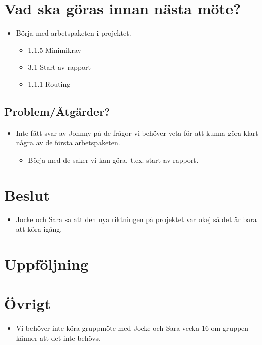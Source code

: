 \section*{Vad ska göras innan nästa möte?}
\begin{itemize}[noitemsep]
	\item Börja med arbetspaketen i projektet.
	\begin{itemize}
		\item 1.1.5 Minimikrav
		\item 3.1 Start av rapport
		\item 1.1.1 Routing
	\end{itemize}
\end{itemize}
\subsection*{Problem/Åtgärder?}
\begin{itemize}
	\item Inte fått svar av Johnny på de frågor vi behöver veta för att kunna göra klart några av de första arbetspaketen.
	\begin{itemize}
		\item Börja med de saker vi kan göra, t.ex. start av rapport.
	\end{itemize}
\end{itemize}

\section*{Beslut}
\begin{itemize}
	\item Jocke och Sara sa att den nya riktningen på projektet var okej så det är bara att köra igång.
\end{itemize} 
\section*{Uppföljning}

\newpage

\section*{Övrigt}
\begin{itemize}
	\item Vi behöver inte köra gruppmöte med Jocke och Sara vecka 16 om gruppen känner att det inte behövs.
\end{itemize}
